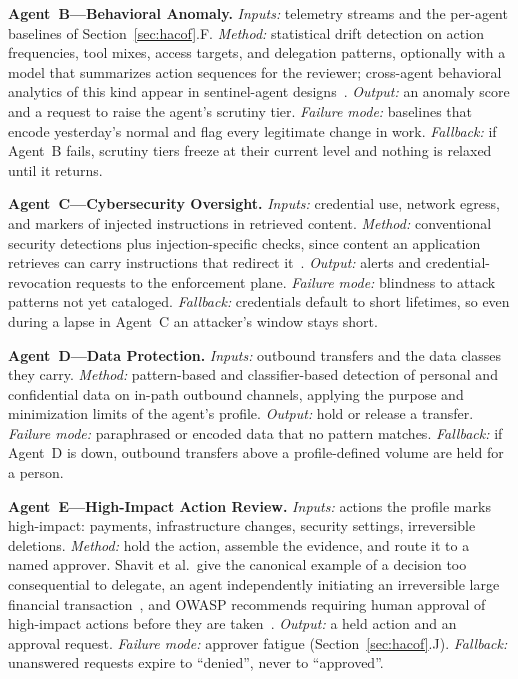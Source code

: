 \documentclass[journal]{IEEEtran}
\begin{document}
\textbf{Agent~B---Behavioral Anomaly.} \textit{Inputs:} telemetry streams and the per-agent baselines of Section~\ref{sec:hacof}.F. \textit{Method:} statistical drift detection on action frequencies, tool mixes, access targets, and delegation patterns, optionally with a model that summarizes action sequences for the reviewer; cross-agent behavioral analytics of this kind appear in sentinel-agent designs~\cite{gosmar2025sentinel}.
\textit{Output:} an anomaly score and a request to raise the agent's scrutiny tier. \textit{Failure mode:} baselines that encode yesterday's normal and flag every legitimate change in work. \textit{Fallback:} if Agent~B fails, scrutiny tiers freeze at their current level and nothing is relaxed until it returns.

\textbf{Agent~C---Cybersecurity Oversight.} \textit{Inputs:} credential use, network egress, and markers of injected instructions in retrieved content. \textit{Method:} conventional security detections plus injection-specific checks, since content an application retrieves can carry instructions that redirect it~\cite{greshake2023injection}.
\textit{Output:} alerts and credential-revocation requests to the enforcement plane. \textit{Failure mode:} blindness to attack patterns not yet cataloged. \textit{Fallback:} credentials default to short lifetimes, so even during a lapse in Agent~C an attacker's window stays short.

\textbf{Agent~D---Data Protection.} \textit{Inputs:} outbound transfers and the data classes they carry. \textit{Method:} pattern-based and classifier-based detection of personal and confidential data on in-path outbound channels, applying the purpose and minimization limits of the agent's profile. \textit{Output:} hold or release a transfer. \textit{Failure mode:} paraphrased or encoded data that no pattern matches. \textit{Fallback:} if Agent~D is down, outbound transfers above a profile-defined volume are held for a person.

\textbf{Agent~E---High-Impact Action Review.} \textit{Inputs:} actions the profile marks high-impact: payments, infrastructure changes, security settings, irreversible deletions. \textit{Method:} hold the action, assemble the evidence, and route it to a named approver. Shavit et al.\ give the canonical example of a decision too consequential to delegate, an agent independently initiating an irreversible large financial transaction~\cite{shavit2023agentic},
and OWASP recommends requiring human approval of high-impact actions before they are taken~\cite{owasp2025llm}.
\textit{Output:} a held action and an approval request. \textit{Failure mode:} approver fatigue (Section~\ref{sec:hacof}.J). \textit{Fallback:} unanswered requests expire to ``denied'', never to ``approved''.
\end{document}
